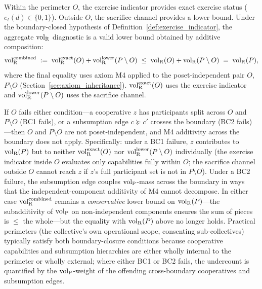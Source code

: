 \begin{remark}
Within the perimeter $O$, the exercise indicator provides exact
exercise status ($e_t(d) \in \{0, 1\}$).  Outside $O$, the
sacrifice channel provides a lower bound.  Under the
boundary-closed hypothesis of
Definition~\ref{def:exercise_indicator}, the aggregate ${\operatorname{vol}_{\mathrm{R}}}$
diagnostic is a valid lower bound obtained by additive
composition:
\[
  {\operatorname{vol}_{\mathrm{R}}^{\mathrm{combined}}} \;:=\; {\operatorname{vol}_{\mathrm{R}}^{\mathrm{exact}}}(O) + {\operatorname{vol}_{\mathrm{R}}^{\mathrm{lower}}}(P \setminus O)
  \;\leq\; {\operatorname{vol}_{\mathrm{R}}}(O) + {\operatorname{vol}_{\mathrm{R}}}(P \setminus O)
  \;=\; {\operatorname{vol}_{\mathrm{R}}}(P),
\]
where the final equality uses axiom M4 applied to the
poset-independent pair $O$, $P \setminus O$
(Section~\ref{sec:axiom_inheritance}).  ${\operatorname{vol}_{\mathrm{R}}^{\mathrm{exact}}}(O)$ uses the
exercise indicator and ${\operatorname{vol}_{\mathrm{R}}^{\mathrm{lower}}}(P \setminus O)$ uses the
sacrifice channel.
\end{remark}

\begin{remark}
\label{rem:boundary_cooperative_undercount}
If $O$ fails either condition---a cooperative $z$ has
participants split across $O$ and $P \setminus O$ (BC1 fails),
or a subsumption edge $c \succeq c'$ crosses the boundary (BC2
fails)---then $O$ and $P \setminus O$ are not
poset-independent, and M4 additivity across the boundary does
not apply.  Specifically: under a BC1 failure, $z$ contributes
to ${\operatorname{vol}_{\mathrm{R}}}(P)$ but to neither ${\operatorname{vol}_{\mathrm{R}}^{\mathrm{exact}}}(O)$ nor ${\operatorname{vol}_{\mathrm{R}}^{\mathrm{lower}}}(P
\setminus O)$ individually (the exercise indicator inside $O$
evaluates only capabilities fully within $O$; the sacrifice
channel outside $O$ cannot reach $z$ if $z$'s full participant
set is not in $P \setminus O$).  Under a BC2 failure, the
subsumption edge couples ${\operatorname{vol}_{\mathrm{P}}}$-mass across the boundary in
ways that the independent-component additivity of M4 cannot
decompose.  In either case ${\operatorname{vol}_{\mathrm{R}}^{\mathrm{combined}}}$ remains a
\emph{conservative} lower bound on ${\operatorname{vol}_{\mathrm{R}}}(P)$---the subadditivity
of ${\operatorname{vol}_{\mathrm{P}}}$ on non-independent components ensures the sum of
pieces is $\leq$ the whole---but the equality with ${\operatorname{vol}_{\mathrm{R}}}(P)$
above no longer holds.  Practical perimeters (the collective's
own operational scope, consenting sub-collectives) typically
satisfy both boundary-closure conditions because cooperative
capabilities and subsumption hierarchies are either wholly
internal to the perimeter or wholly external; where either BC1
or BC2 fails, the undercount is quantified by the ${\operatorname{vol}_{\mathrm{P}}}$-weight
of the offending cross-boundary cooperatives and subsumption
edges.
\end{remark}
